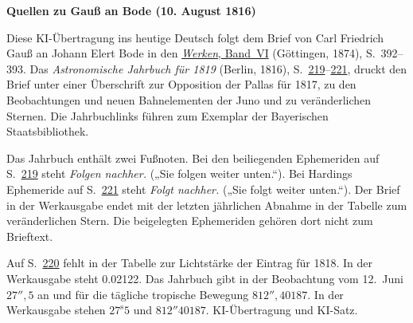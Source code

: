\clearpage\thispagestyle{empty}
\begin{center}\textbf{Quellen zu Gauß an Bode (10. August 1816)}\end{center}
\noindent Diese KI-Übertragung ins heutige Deutsch folgt dem Brief von Carl Friedrich Gauß an Johann Elert Bode in den \href{https://gdz.sub.uni-goettingen.de/id/PPN236007467}{\textit{Werken}, Band~VI} (Göttingen, 1874), S.~392--393. Das \textit{Astronomische Jahrbuch für 1819} (Berlin, 1816), S.~\href{https://api.digitale-sammlungen.de/iiif/image/v2/bsb10538348_00225/full/1600,/0/default.jpg}{219}--\href{https://api.digitale-sammlungen.de/iiif/image/v2/bsb10538348_00227/full/1600,/0/default.jpg}{221}, druckt den Brief unter einer Überschrift zur Opposition der Pallas für 1817, zu den Beobachtungen und neuen Bahnelementen der Juno und zu veränderlichen Sternen. Die Jahrbuchlinks führen zum Exemplar der Bayerischen Staatsbibliothek.
\par\smallskip\noindent Das Jahrbuch enthält zwei Fußnoten. Bei den beiliegenden Ephemeriden auf S.~\href{https://api.digitale-sammlungen.de/iiif/image/v2/bsb10538348_00225/full/1600,/0/default.jpg}{219} steht \textit{Folgen nachher.} („Sie folgen weiter unten.“). Bei Hardings Ephemeride auf S.~\href{https://api.digitale-sammlungen.de/iiif/image/v2/bsb10538348_00227/full/1600,/0/default.jpg}{221} steht \textit{Folgt nachher.} („Sie folgt weiter unten.“). Der Brief in der Werkausgabe endet mit der letzten jährlichen Abnahme in der Tabelle zum veränderlichen Stern. Die beigelegten Ephemeriden gehören dort nicht zum Brieftext.
\par\smallskip\noindent Auf S.~\href{https://api.digitale-sammlungen.de/iiif/image/v2/bsb10538348_00226/full/1600,/0/default.jpg}{220} fehlt in der Tabelle zur Lichtstärke der Eintrag für 1818. In der Werkausgabe steht 0.02122. Das Jahrbuch gibt in der Beobachtung vom 12.~Juni $27''{,}5$ an und für die tägliche tropische Bewegung $812''{,}40187$. In der Werkausgabe stehen $27^{\mathrm s}5$ und $812''40187$. KI-Übertragung und KI-Satz.
\clearpage

